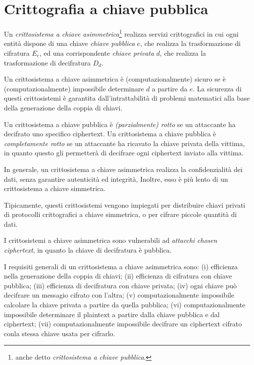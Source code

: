 \chapter{Crittografia a chiave pubblica}
\label{chp:public-key-cryptography}

Un \textit{crittosistema a chiave asimmetrica}\footnote{anche detto \textit{crittosistema a chiave pubblica}.} realizza servizi crittografici in cui ogni entità dispone di una chiave \textit{chiave pubblica} $e$, che realizza la trasformazione di cifratura $E_{e}$, ed una corrispondente \textit{chiave privata} $d$, che realizza la trasformazione di decifratura $D_{d}$.

Un crittosistema a chiave asimmetrica è (computazionalmente) sicuro se è (computazionalmente) impossibile determinare $d$ a partire da $e$. La sicurezza di questi crittosistemi è garantita dall'intrattabilità di problemi matematici alla base della generazione della coppia di chiavi.

Un crittosistema a chiave pubblica è \textit{(parzialmente) rotto} se un attaccante ha decifrato uno specifico ciphertext.
Un crittosistema a chiave pubblica è \textit{completamente rotto} se un attaccante ha ricavato la chiave privata della vittima, in quanto questo gli permetterà di decifrare ogni ciphertext inviato alla vittima.

In generale, un crittosistema a chiave asimmetrica realizza la confidenzialità dei dati, senza garantire autenticità ed integrità,  Inoltre, esso è più lento di un crittosistema a chiave simmetrica.

Tipicamente, questi crittosistemi vengono impiegati per distribuire chiavi privati di protocolli crittografici a chiave simmetrica, o per cifrare piccole quantità di dati.

I crittosistemi a chiave asimmetrica sono vulnerabili ad \textit{attacchi chosen ciphertext}, in quanto la chiave di decifratura è pubblica.

I requisiti generali di un crittosistema a chiave asimmetrica sono:
(i) efficienza nella generazione della coppia di chiavi;
(ii) efficienza di cifratura con chiave pubblica;
(iii) efficienza di decifratura con chiave privata;
(iv) ogni chiave può decifrare un messagio cifrato con l'altra;
(v) computazionalmente impossibile calcolare la chiave privata a partire da quella pubblica;
(vi) computazionalmente impossibile determinare il plaintext a partire dalla chiave pubblica e dal ciphertext;
(vii) computazionalmente impossibile decifrare un ciphertext cifrato conla stessa chiave usata per cifrarlo.


